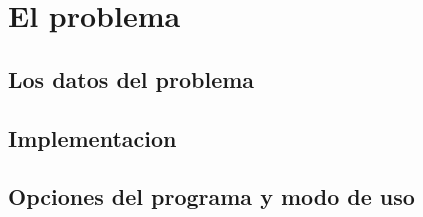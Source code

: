 \section{El problema}
\subsection{Los datos del problema}
\subsection{Implementacion}
\subsection{Opciones del programa y modo de uso}